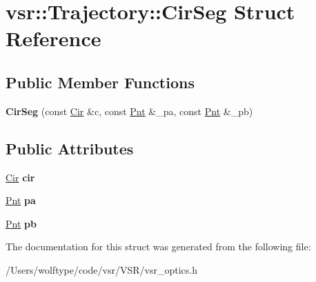 \hypertarget{structvsr_1_1_trajectory_1_1_cir_seg}{\section{vsr\-:\-:Trajectory\-:\-:Cir\-Seg Struct Reference}
\label{structvsr_1_1_trajectory_1_1_cir_seg}
}
\subsection*{Public Member Functions}
\begin{DoxyCompactItemize}
\item 
\hypertarget{structvsr_1_1_trajectory_1_1_cir_seg_a063553cb61e4ca865ac63d59cc89dc0f}{{\bfseries Cir\-Seg} (const \hyperlink{namespacevsr_a2744605aa828e495fc85463b7ae0d045}{Cir} \&c, const \hyperlink{namespacevsr_a2d05beb9721c5d9211b479af6d47222d}{Pnt} \&\-\_\-pa, const \hyperlink{namespacevsr_a2d05beb9721c5d9211b479af6d47222d}{Pnt} \&\-\_\-pb)}\label{structvsr_1_1_trajectory_1_1_cir_seg_a063553cb61e4ca865ac63d59cc89dc0f}

\end{DoxyCompactItemize}
\subsection*{Public Attributes}
\begin{DoxyCompactItemize}
\item 
\hypertarget{structvsr_1_1_trajectory_1_1_cir_seg_ad03965f46c60ae9c5198451fa8eb3b14}{\hyperlink{namespacevsr_a2744605aa828e495fc85463b7ae0d045}{Cir} {\bfseries cir}}\label{structvsr_1_1_trajectory_1_1_cir_seg_ad03965f46c60ae9c5198451fa8eb3b14}

\item 
\hypertarget{structvsr_1_1_trajectory_1_1_cir_seg_a5ca1bdf8a88b0e002b31d527ab415a4c}{\hyperlink{namespacevsr_a2d05beb9721c5d9211b479af6d47222d}{Pnt} {\bfseries pa}}\label{structvsr_1_1_trajectory_1_1_cir_seg_a5ca1bdf8a88b0e002b31d527ab415a4c}

\item 
\hypertarget{structvsr_1_1_trajectory_1_1_cir_seg_ac9fa277c373a8f6e5cb8ad52b3bbab10}{\hyperlink{namespacevsr_a2d05beb9721c5d9211b479af6d47222d}{Pnt} {\bfseries pb}}\label{structvsr_1_1_trajectory_1_1_cir_seg_ac9fa277c373a8f6e5cb8ad52b3bbab10}

\end{DoxyCompactItemize}


The documentation for this struct was generated from the following file\-:\begin{DoxyCompactItemize}
\item 
/\-Users/wolftype/code/vsr/\-V\-S\-R/vsr\-\_\-optics.\-h\end{DoxyCompactItemize}
